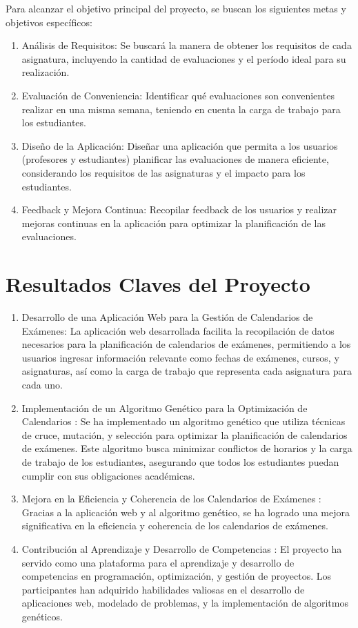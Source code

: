 \documentclass{article}
\begin{document}
Para alcanzar el objetivo principal del proyecto, se buscan los siguientes metas y objetivos específicos:

\begin{enumerate}
\item Análisis de Requisitos: Se buscará la manera de obtener los requisitos de cada asignatura, incluyendo la cantidad de evaluaciones y el período ideal para su realización.
\item Evaluación de Conveniencia: Identificar qué evaluaciones son convenientes realizar en una misma semana, teniendo en cuenta la carga de trabajo para los estudiantes.
\item Diseño de la Aplicación: Diseñar una aplicación que permita a los usuarios (profesores y estudiantes) planificar las evaluaciones de manera eficiente, considerando los requisitos de las asignaturas y el impacto para los estudiantes.
\item Feedback y Mejora Continua: Recopilar feedback de los usuarios y realizar mejoras continuas en la aplicación para optimizar la planificación de las evaluaciones.
\end{enumerate}
\section{Resultados Claves del Proyecto}
\begin{enumerate}
\item{Desarrollo de una Aplicación Web para la Gestión de Calendarios de Exámenes: }
La aplicación web desarrollada facilita la recopilación de datos necesarios para la planificación de calendarios de exámenes, permitiendo a los usuarios ingresar información relevante como fechas de exámenes, cursos, y asignaturas, así como la carga de trabajo que representa cada asignatura para cada uno.

\item{Implementación de un Algoritmo Genético para la Optimización de Calendarios :}
Se ha implementado un algoritmo genético que utiliza técnicas de cruce, mutación, y selección para optimizar la planificación de calendarios de exámenes. Este algoritmo busca minimizar conflictos de horarios y la carga de trabajo de los estudiantes, asegurando que todos los estudiantes puedan cumplir con sus obligaciones académicas.

\item{Mejora en la Eficiencia y Coherencia de los Calendarios de Exámenes :}
Gracias a la aplicación web y al algoritmo genético, se ha logrado una mejora significativa en la eficiencia y coherencia de los calendarios de exámenes.

\item{Contribución al Aprendizaje y Desarrollo de Competencias :}
El proyecto ha servido como una plataforma para el aprendizaje y desarrollo de competencias en programación, optimización, y gestión de proyectos. Los participantes han adquirido habilidades valiosas en el desarrollo de aplicaciones web, modelado de problemas, y la implementación de algoritmos genéticos.
\end{enumerate}
\end{document}
